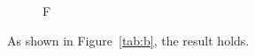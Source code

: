 \documentclass{article}
\begin{document}
\begin{figure}\caption{F}\label{fig:a}\end{figure}
\begin{table}\caption{T}\label{tab:b}\end{table}
As shown in Figure~\ref{tab:b}, the result holds.
\end{document}
